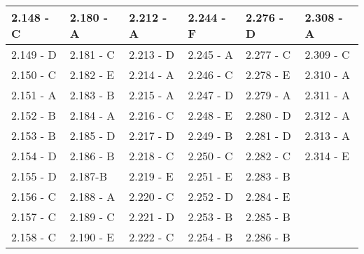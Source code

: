 \begin{center}
\begin{tabular}{|l|l|l|l|l|l|}
\hline
2.148 - C & 2.180 - A & 2.212 - A & 2.244 - F & 2.276 - D & 2.308 - A \\
\hline
2.149 - D & 2.181 - C & 2.213 - D & 2.245 - A & 2.277 - C & 2.309 - C \\
\hline
2.150 - C & 2.182 - E & 2.214 - A & 2.246 - C & 2.278 - E & 2.310 - A \\
\hline
2.151 - A & 2.183 - B & 2.215 - A & 2.247 - D & 2.279 - A & 2.311 - A \\
\hline
2.152 - B & 2.184 - A & 2.216 - C & 2.248 - E & 2.280 - D & 2.312 - A \\
\hline
2.153 - B & 2.185 - D & 2.217 - D & 2.249 - B & 2.281 - D & 2.313 - A \\
\hline
2.154 - D & 2.186 - B & 2.218 - C & 2.250 - C & 2.282 - C & 2.314 - E \\
\hline
2.155 - D & 2.187-B & 2.219 - E & 2.251 - E & 2.283 - B &  \\
\hline
2.156 - C & 2.188 - A & 2.220 - C & 2.252 - D & 2.284 - E &  \\
\hline
2.157 - C & 2.189 - C & 2.221 - D & 2.253 - B & 2.285 - B &  \\
\hline
2.158 - C & 2.190 - E & 2.222 - C & 2.254 - B & 2.286 - B &  \\
\hline
\end{tabular}
\end{center}

